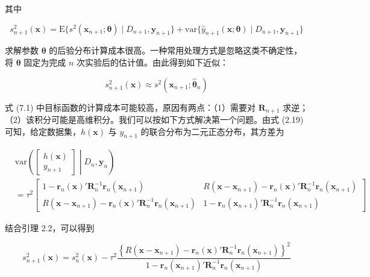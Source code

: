 \documentclass{ctexart}
\begin{document}
其中

\begin{equation*}
s^2_{n+1}(\boldsymbol{x})=\mathrm{E}\{s^2(\boldsymbol{x}_{n+1};\boldsymbol{\theta})\mid D_{n+1},\boldsymbol{y}_{n+1}\}+\mathrm{var}\{\widehat y_{n+1}(\boldsymbol{x};\boldsymbol{\theta})\mid D_{n+1},\boldsymbol{y}_{n+1}\}
\end{equation*}

求解参数 $\boldsymbol{\theta}$ 的后验分布计算成本很高。一种常用处理方式是忽略这类不确定性，将 $\boldsymbol{\theta}$ 固定为完成 $n$ 次实验后的估计值。由此得到如下近似：

\begin{equation*}
s^2_{n+1}(\boldsymbol{x})\approx s^2(\boldsymbol{x}_{n+1};\widehat{\boldsymbol{\theta}}_n)
\end{equation*}

式 (7.1) 中目标函数的计算成本可能较高，原因有两点：（1）需要对 $\boldsymbol{R}_{n+1}$ 求逆；（2）该积分可能是高维积分。我们可以按如下方式解决第一个问题。由式 (2.19) 可知，给定数据集，$h(\boldsymbol{x})$ 与 $y_{n+1}$ 的联合分布为二元正态分布，其方差为

\begin{align*}
&\mathrm{var}\left(\left.\begin{bmatrix}h(\boldsymbol{x})\\y_{n+1}\end{bmatrix}\middle|D_n\right., \boldsymbol{y}_n\right)\\
&=\tau^2\begin{bmatrix}
1-\boldsymbol{r}_n(\boldsymbol{x})'\boldsymbol{R}_n^{-1}\boldsymbol{r}_n(\boldsymbol{x}_{n+1})&R(\boldsymbol{x}-\boldsymbol{x}_{n+1})-\boldsymbol{r}_n(\boldsymbol{x})'\boldsymbol{R}_n^{-1}\boldsymbol{r}_n(\boldsymbol{x}_{n+1})\\
R(\boldsymbol{x}-\boldsymbol{x}_{n+1})-\boldsymbol{r}_n(\boldsymbol{x})'\boldsymbol{R}_n^{-1}\boldsymbol{r}_n(\boldsymbol{x}_{n+1})&1-\boldsymbol{r}_n(\boldsymbol{x}_{n+1})'\boldsymbol{R}_n^{-1}\boldsymbol{r}_n(\boldsymbol{x}_{n+1})
\end{bmatrix}
\end{align*}

结合引理 2.2，可以得到

\begin{equation*}
s_{n+1}^2(\boldsymbol{x})=s_n^2(\boldsymbol{x})-\tau^2\frac{\left\{R(\boldsymbol{x}-\boldsymbol{x}_{n+1})-\boldsymbol{r}_n(\boldsymbol{x})'\boldsymbol{R}_n^{-1}\boldsymbol{r}_n(\boldsymbol{x}_{n+1})\right\}^2}{1-\boldsymbol{r}_n(\boldsymbol{x}_{n+1})'\boldsymbol{R}_n^{-1}\boldsymbol{r}_n(\boldsymbol{x}_{n+1})}
\tag{7.2}
\end{equation*}
\end{document}

